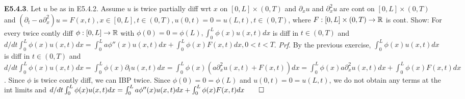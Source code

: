 {\bf E5.4.3}. Let $u$ be as in E5.4.2. Assume $u$ is twice partially diff wrt $x$ on $[0,L] \times (0,T)$ and $\partial_xu$ and $\partial_x^2u$ are cont on $[0,L] \times (0,T)$ and $(\partial_t - a \partial_x^2)u = F(x,t), x \in [0,L], t \in (0, T), u(0,t)=0=u(L,t), t \in (0, T)$, where $F: [0, L] \times (0, T) \rightarrow \mathbb{R}$ is cont. Show: For every twice contly diff $\phi: [0,L] \rightarrow \mathbb{R}$ with $\phi(0) = 0 = \phi(L), \int_0^L \phi(x)u(x,t) dx$ is diff in $t \in (0,T)$ and $d/dt \int_0^L \phi(x)u(x,t) dx= \int_0^L a\phi''(x)u(x,t) dx + \int_0^L \phi(x)F(x,t) dx, 0 < t < T$. {\it Prf}. By the previous exercise, $\int_0^L \phi(x)u(x,t) dx$ is diff in $t \in (0, T)$ and $d/dt \int_0^L \phi(x)u(x,t) dx=\int_0^L \phi(x) \partial_t u(x,t) dx=\int_0^L \phi(x) (a \partial_x^2 u(x,t) + F(x,t)) dx= \int_0^L \phi(x) a \partial_x^2 u(x,t) dx + \int_0^L \phi(x) F(x,t) dx$.  Since $\phi$ is twice contly diff, we can IBP twice.  Since $\phi(0)=0=\phi(L)$ and $u(0,t)=0=u(L,t)$, we do not obtain any terms at the int limits and $d/dt \int_0^L \phi(x)u(x,t) dx=  \int_0^L a \phi''(x)  u(x,t) dx + \int_0^L \phi(x) F(x,t) dx \qed$
